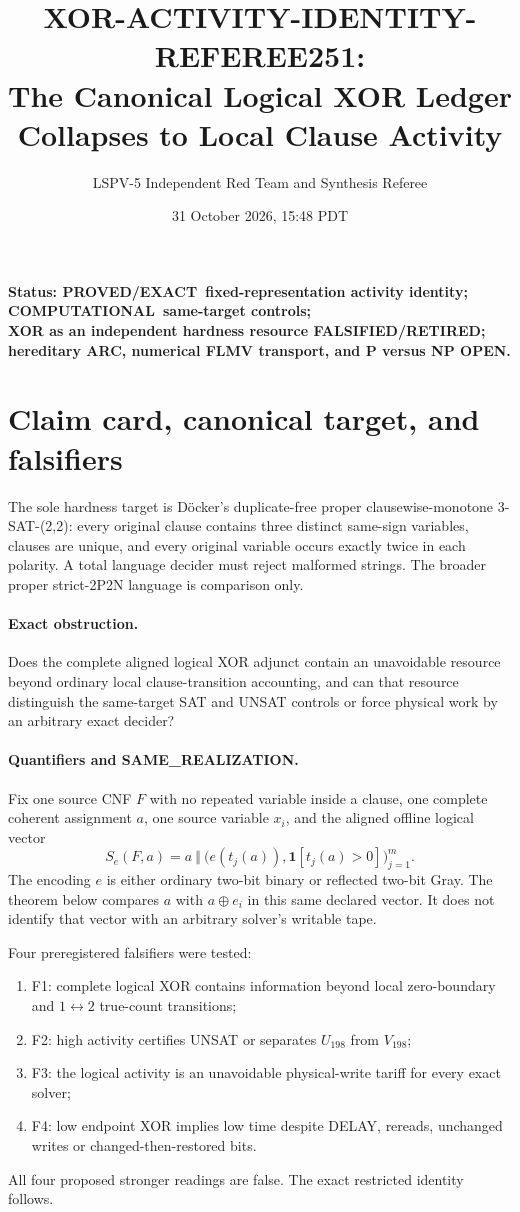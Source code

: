 \documentclass[11pt]{article}
\title{XOR-ACTIVITY-IDENTITY-REFEREE251:\\The Canonical Logical XOR Ledger Collapses to Local Clause Activity}
\author{LSPV-5 Independent Red Team and Synthesis Referee}
\date{31 October 2026, 15:48 PDT}
\newcommand{\EXACT}{\textbf{PROVED/EXACT}}
\newcommand{\COMP}{\textbf{COMPUTATIONAL}}
\newcommand{\OPEN}{\textbf{OPEN}}
\newcommand{\RET}{\textbf{FALSIFIED/RETIRED}}
\begin{document}
\maketitle

\begin{center}
\textbf{Status: \EXACT\ fixed-representation activity identity; \COMP\ same-target controls;\\
XOR as an independent hardness resource \RET; hereditary ARC, numerical FLMV transport,
and P versus NP \OPEN.}
\end{center}

\section{Claim card, canonical target, and falsifiers}
The sole hardness target is D\"ocker's duplicate-free proper clausewise-monotone
3-SAT-(2,2): every original clause contains three distinct same-sign variables, clauses
are unique, and every original variable occurs exactly twice in each polarity.  A total
language decider must reject malformed strings.  The broader proper strict-2P2N language
is comparison only.

\paragraph{Exact obstruction.}
Does the complete aligned logical XOR adjunct contain an unavoidable resource beyond
ordinary local clause-transition accounting, and can that resource distinguish the
same-target SAT and UNSAT controls or force physical work by an arbitrary exact decider?

\paragraph{Quantifiers and SAME\_REALIZATION.}
Fix one source CNF $F$ with no repeated variable inside a clause, one complete coherent
assignment $a$, one source variable $x_i$, and the aligned offline logical vector
\[
 S_e(F,a)=a\ \Vert\ \bigl(e(t_j(a)),\mathbf1[t_j(a)>0]\bigr)_{j=1}^{m}.
\]
The encoding $e$ is either ordinary two-bit binary or reflected two-bit Gray.  The
theorem below compares $a$ with $a\oplus e_i$ in this same declared vector.  It does not
identify that vector with an arbitrary solver's writable tape.

Four preregistered falsifiers were tested:
\begin{enumerate}
\item F1: complete logical XOR contains information beyond local zero-boundary and
      $1\leftrightarrow2$ true-count transitions;
\item F2: high activity certifies UNSAT or separates $U_{198}$ from $V_{198}$;
\item F3: the logical activity is an unavoidable physical-write tariff for every exact
      solver;
\item F4: low endpoint XOR implies low time despite DELAY, rereads, unchanged writes or
      changed-then-restored bits.
\end{enumerate}
All four proposed stronger readings are false.  The exact restricted identity follows.
\end{document}
